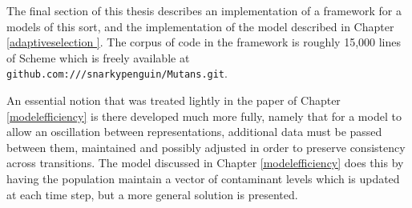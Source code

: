 The final section of this thesis describes an implementation of a
framework for a models of this sort, and the implementation of the
model described in Chapter \ref{adaptiveselection }. The corpus of
code in the framework is roughly 15,000 lines of Scheme which is
freely available at \texttt{github.com:///snarkypenguin/Mutans.git}.

An essential notion that was treated lightly in the paper of
Chapter \ref{modelefficiency} is there developed much more fully,
namely that for a model to allow an oscillation between
representations, additional data must be passed between them,
maintained and possibly adjusted in order to preserve consistency
across transitions.  The model discussed in
Chapter \ref{modelefficiency} does this by having the population
maintain a vector of contaminant levels which is updated at each time
step, but a more general solution is presented.


